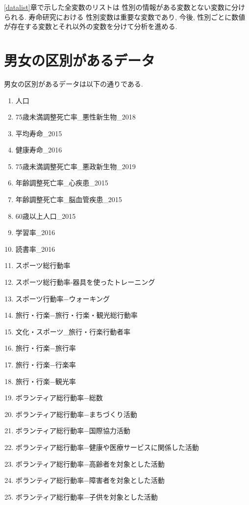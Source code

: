 \ref{datalist}章で示した全変数のリストは
性別の情報がある変数とない変数に分けられる.
寿命研究における
性別変数は重要な変数であり,
今後, 性別ごとに数値が存在する変数とそれ以外の変数を分けて分析を進める.

\section{男女の区別があるデータ}

男女の区別があるデータは以下の通りである.

\begin{multicols}{2}

\begin{enumerate}
  \item 人口
  \item 75歳未満調整死亡率\_悪性新生物\_2018
  \item 平均寿命\_2015
  \item 健康寿命\_2016
  \item 75歳未満調整死亡率\_悪政新生物\_2019
  \item 年齢調整死亡率\_心疾患\_2015
  \item 年齢調整死亡率\_脳血管疾患\_2015
  \item 60歳以上人口\_2015
  \item 学習率\_2016
  \item 読書率\_2016
  \item スポーツ総行動率
  \item スポーツ総行動率-器具を使ったトレーニング
  \item スポーツ行動率−ウォーキング
  \item 旅行・行楽−旅行・行楽・観光総行動率
  \item 文化・スポーツ\_旅行・行楽行動者率
  \item 旅行・行楽−旅行率
  \item 旅行・行楽−行楽率
  \item 旅行・行楽−観光率
  \item ボランティア総行動率−総数
  \item ボランティア総行動率−まちづくり活動
  \item ボランティア総行動率−国際協力活動
  \item ボランティア総行動率−健康や医療サービスに関係した活動
  \item ボランティア総行動率−高齢者を対象とした活動
  \item ボランティア総行動率−障害者を対象とした活動
  \item ボランティア総行動率−子供を対象とした活動

\end{enumerate}
\end{multicols}
